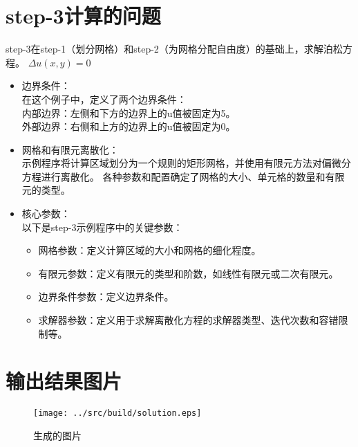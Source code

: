 \documentclass{ctexart}
\begin{document}
\section{step-3计算的问题}
step-3在step-1（划分网格）和step-2（为网格分配自由度）的基础上，求解泊松方程。
\(\Delta u(x,y) = 0\)
\begin{itemize}
    \item 边界条件：\\
    在这个例子中，定义了两个边界条件：\\
        内部边界：左侧和下方的边界上的u值被固定为5。\\
        外部边界：右侧和上方的边界上的u值被固定为0。
    \item 网格和有限元离散化：\\
    示例程序将计算区域划分为一个规则的矩形网格，并使用有限元方法对偏微分方程进行离散化。
    各种参数和配置确定了网格的大小、单元格的数量和有限元的类型。
    \item 核心参数：\\
    以下是step-3示例程序中的关键参数：\begin{itemize}
        \item 网格参数：定义计算区域的大小和网格的细化程度。
        \item 有限元参数：定义有限元的类型和阶数，如线性有限元或二次有限元。
        \item 边界条件参数：定义边界条件。
        \item 求解器参数：定义用于求解离散化方程的求解器类型、迭代次数和容错限制等。
    \end{itemize}
\end{itemize}

\section{输出结果图片}
\begin{figure}[H]
    \centering
    \texttt{[image: ../src/build/solution.eps]}
    \caption{生成的图片}
    \label{fig:picture}
\end{figure}
\end{document}
